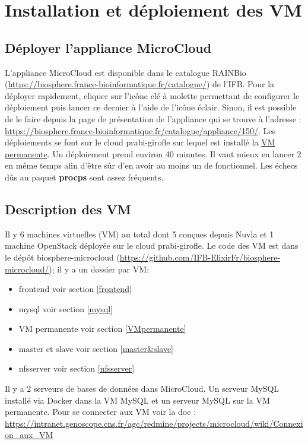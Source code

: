 \section {Installation et déploiement des VM}

\subsection{Déployer l'appliance MicroCloud}

L'appliance MicroCloud est disponible dans le catalogue RAINBio (\url{https://biosphere.france-bioinformatique.fr/catalogue/}) de l'IFB.
Pour la déployer rapidement, cliquer sur l'icône clé à molette permettant de configurer le déploiement puis lancer ce dernier à l'aide de l'icône éclair. Sinon, il est possible de le faire depuis la page de présentation de l'appliance qui se trouve à l'adresse : \url{https://biosphere.france-bioinformatique.fr/catalogue/appliance/150/}.
Les déploiements se font sur le cloud prabi-girofle sur lequel est installé la \hyperref[VM permanente]{VM permanente}.
Un déploiement prend environ 40 minutes.
Il vaut mieux en lancer 2 en même temps afin d'être sûr d'en avoir au moins un de fonctionnel.
Les échecs dûs au paquet \textbf{procps} sont assez fréquents.

\subsection {Description des VM}

Il y 6 machines virtuelles (VM) au total dont 5 conçues depuis Nuvla et 1 machine OpenStack déployée sur le cloud prabi-girofle.
Le code des VM est dans le dépôt biosphere-microcloud (\url{https://github.com/IFB-ElixirFr/biosphere-microcloud/}); il y a un dossier par VM:

\begin{itemize}
	\item frontend voir section \ref{frontend}
	\item mysql voir section \ref{mysql}
	\item VM permanente voir section \ref{VMpermanente}
	\item master et slave voir section \ref{master&slave}
	\item nfsserver voir section \ref{nfsserver}
\end{itemize}

Il y a 2 serveurs de bases de données dans MicroCloud. Un serveur MySQL installé via Docker dans la VM MySQL et un serveur MySQL sur la VM permanente.
Pour se connecter aux VM voir la doc : \url{https://intranet.genoscope.cns.fr/agc/redmine/projects/microcloud/wiki/Connexion_aux_VM}


